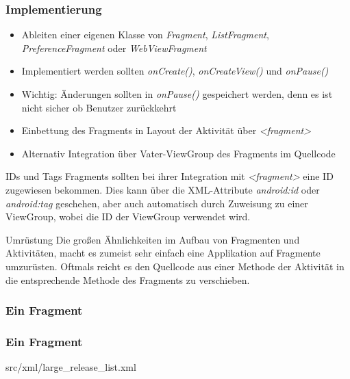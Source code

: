 \begin{frame}[label=fragment_implementation]
   \frametitle{Implementierung}
   \begin{itemize}
      \item Ableiten einer eigenen Klasse von \emph{Fragment}, \emph{ListFragment}, 
      	\emph{PreferenceFragment} oder \emph{WebViewFragment}
      \item Implementiert werden sollten \emph{onCreate()}, 
			\emph{onCreateView()} und \emph{onPause()}
      \item Wichtig: Änderungen sollten in \emph{onPause()} gespeichert werden, 
      	denn es ist nicht sicher ob Benutzer zurückkehrt
      \item Einbettung des Fragments in Layout der Aktivität über 
      	\emph{\textless{}fragment\textgreater}
      \item Alternativ Integration über Vater-ViewGroup des Fragments 
      	im Quellcode
   \end{itemize}

   \begin{alertblock}{IDs und Tags}
		Fragments sollten bei ihrer Integration mit \emph{\textless{}fragment\textgreater} 
		eine ID zugewiesen bekommen. Dies kann über die XML-Attribute \emph{android:id} oder 
		\emph{android:tag} geschehen, aber auch automatisch durch Zuweisung zu einer ViewGroup, 
		wobei die ID der ViewGroup verwendet wird.\\
   \end{alertblock}
   
   \begin{alertblock}{Umrüstung}
		Die großen Ähnlichkeiten im Aufbau von Fragmenten und Aktivitäten, macht es 
		zumeist sehr einfach eine Applikation auf Fragmente umzurüsten. 
		Oftmals reicht es den Quellcode aus einer Methode der Aktivität in die 
		entsprechende Methode des Fragments zu verschieben.
   \end{alertblock}
\end{frame}

\begin{frame}[label=first_fragment]
   \frametitle{Ein Fragment}
	
\end{frame}

\begin{frame}[label=include_layout_fragment]
   \frametitle{Ein Fragment}
	
		{src/xml/large_release_list.xml}
\end{frame}

